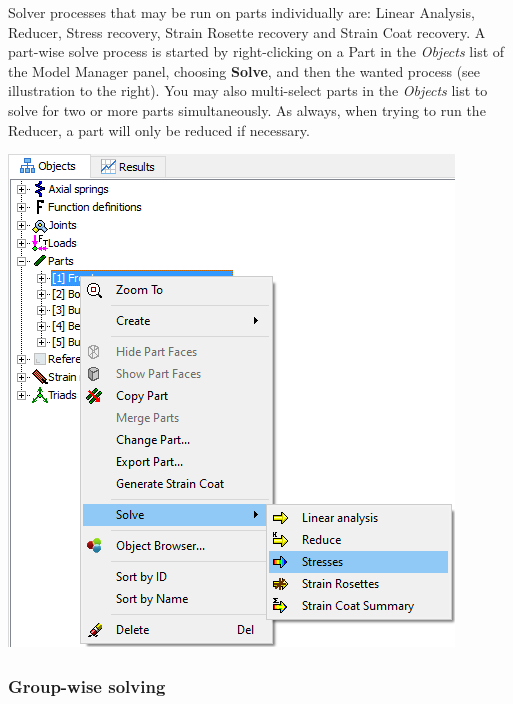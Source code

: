 {\noindent
\begin{minipage}{0.45\textwidth}
  \raggedright
  Solver processes that may be run on parts individually are: Linear Analysis,
  Reducer, Stress recovery, Strain Rosette recovery and Strain Coat recovery.
  A part-wise solve process is started by right-clicking on a Part in the
  {\sl Objects} list of the Model Manager panel, choosing \textbf{Solve},
  and then the wanted process (see illustration to the right).
  You may also multi-select parts in the {\sl Objects} list to solve for two or
  more parts simultaneously. As always, when trying to run the Reducer,
  a part will only be reduced if necessary.
\end{minipage}%
\hfill\begin{minipage}{0.5\textwidth}
  \includegraphics[width=\textwidth]{Figures/6-LinkwiseSolve}
\end{minipage}

\clearpage

\subsubsection{Group-wise solving}

}
